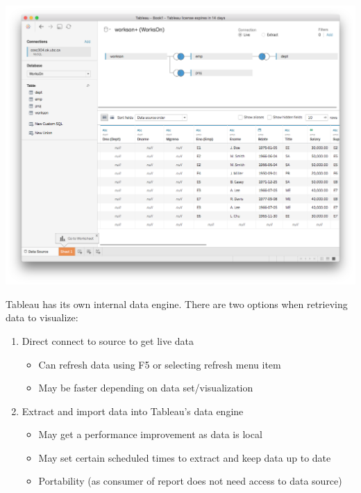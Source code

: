 \documentclass[xcolor=svgnames]{beamer} %
\begin{document}
\begin{frame}
\begin{center}
\includegraphics[width=.9\textwidth]{img/mySQLtables}
\end{center}
\end{frame}



\begin{frame}
Tableau has its own internal data engine. There are two options when retrieving data to visualize:
\begin{enumerate}
\item Direct connect to source to get live data
\begin{itemize}
\item Can refresh data using F5 or selecting refresh menu item
\item May be faster depending on data set/visualization
\end{itemize}
\item  Extract and import data into Tableau's data engine
\begin{itemize}
\item May get a performance improvement as data is local
\item May set certain scheduled times to extract and keep data up to date
\item Portability (as consumer of report does not need access to data source)
\end{itemize}
\end{enumerate}
\end{frame}
\end{document}
